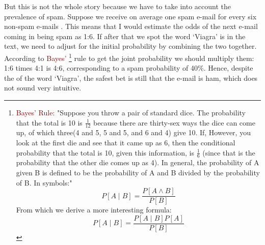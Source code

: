 \documentclass{tufte-handout}
\newcommand{\hlred}[1]{\textcolor{Maroon}{#1}}%
\begin{document}
But this is not the whole story because we have to take into account the prevalence of spam. Suppose we receive on average one spam e-mail for every six non-spam e-mails . This means that I would estimate the odds of the next e-mail coming in being spam as 1:6. If after that we spot the word ‘Viagra’ is in the text, we need to adjust for the initial probability by combining the two together. According to \hlred{Bayes'} \footnote{\hlred{Bayes' Rule}: "Suppose you throw a pair of standard dice. The probability that the total is 10 is \(\frac{1}{12}\) because there are thirty-sex ways the dice can come up, of which three(4 and 5, 5 and 5, and 6 and 4) give 10. If, However, you look at the first die and see that it came up as 6, then the conditional probability that the total is 10, given this information, is \(\frac{1}{6}\)   (since that is the probability that the other die comes up as 4).  In general, the probability of A given B is defined to be the probability of A and B divided by the probability of B. In symbols:"\[ P[A \mid B]=\frac{P[A \wedge B] }{P[B]}\] From which we derive a more interesting formula:
\[ P[A \mid B]=\frac{P[A \mid B]P[A] }{P[B]}\] \cite{Gowers2008}} rule to get the joint probability we should multiply them: 1:6 times 4:1 is 4:6, corresponding to a spam probability of 40\%. Hence, despite the  of the word ‘Viagra’, the safest bet is still that the e-mail is ham, which does not sound very intuitive.
\end{document}
